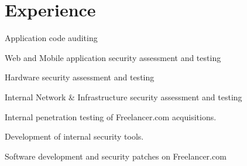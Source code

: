 \documentclass[letterpaper]{deedy-resume} %
\begin{document}
\begin{minipage}[t]{0.60\textwidth} %



\section{Experience}
\vspace{\topsep}

\vspace{\topsep} %
\vspace{\topsep} %
\begin{tightitemize}
\item Application code auditing
\item Web and Mobile application security assessment and testing
\item Hardware security assessment and testing
\item Internal Network \& Infrastructure security assessment and testing
\end{tightitemize}

\sectionspace %
\sectionspace %


\vspace{\topsep} %
\begin{tightitemize}
\item Internal penetration testing of Freelancer.com acquisitions.
\item Development of internal security tools.
\item Software development and security patches on Freelancer.com
\end{tightitemize}

\sectionspace %
\sectionspace %



\end{minipage}
\end{document}
